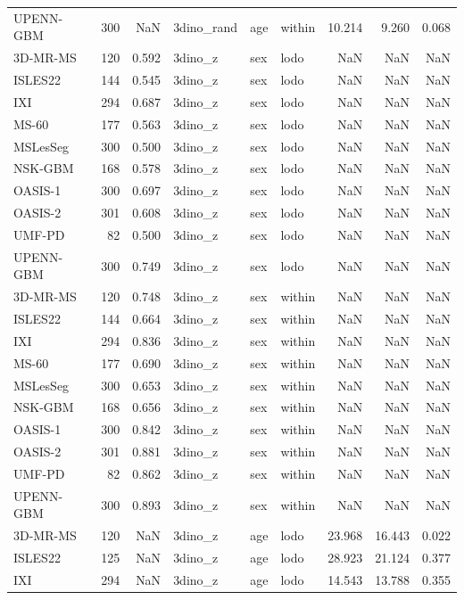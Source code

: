 \begin{tabular}{lrrlllrrr}
UPENN-GBM & 300 & NaN & 3dino\_rand & age & within & 10.214 & 9.260 & 0.068 \\
3D-MR-MS & 120 & 0.592 & 3dino\_z & sex & lodo & NaN & NaN & NaN \\
ISLES22 & 144 & 0.545 & 3dino\_z & sex & lodo & NaN & NaN & NaN \\
IXI & 294 & 0.687 & 3dino\_z & sex & lodo & NaN & NaN & NaN \\
MS-60 & 177 & 0.563 & 3dino\_z & sex & lodo & NaN & NaN & NaN \\
MSLesSeg & 300 & 0.500 & 3dino\_z & sex & lodo & NaN & NaN & NaN \\
NSK-GBM & 168 & 0.578 & 3dino\_z & sex & lodo & NaN & NaN & NaN \\
OASIS-1 & 300 & 0.697 & 3dino\_z & sex & lodo & NaN & NaN & NaN \\
OASIS-2 & 301 & 0.608 & 3dino\_z & sex & lodo & NaN & NaN & NaN \\
UMF-PD & 82 & 0.500 & 3dino\_z & sex & lodo & NaN & NaN & NaN \\
UPENN-GBM & 300 & 0.749 & 3dino\_z & sex & lodo & NaN & NaN & NaN \\
3D-MR-MS & 120 & 0.748 & 3dino\_z & sex & within & NaN & NaN & NaN \\
ISLES22 & 144 & 0.664 & 3dino\_z & sex & within & NaN & NaN & NaN \\
IXI & 294 & 0.836 & 3dino\_z & sex & within & NaN & NaN & NaN \\
MS-60 & 177 & 0.690 & 3dino\_z & sex & within & NaN & NaN & NaN \\
MSLesSeg & 300 & 0.653 & 3dino\_z & sex & within & NaN & NaN & NaN \\
NSK-GBM & 168 & 0.656 & 3dino\_z & sex & within & NaN & NaN & NaN \\
OASIS-1 & 300 & 0.842 & 3dino\_z & sex & within & NaN & NaN & NaN \\
OASIS-2 & 301 & 0.881 & 3dino\_z & sex & within & NaN & NaN & NaN \\
UMF-PD & 82 & 0.862 & 3dino\_z & sex & within & NaN & NaN & NaN \\
UPENN-GBM & 300 & 0.893 & 3dino\_z & sex & within & NaN & NaN & NaN \\
3D-MR-MS & 120 & NaN & 3dino\_z & age & lodo & 23.968 & 16.443 & 0.022 \\
ISLES22 & 125 & NaN & 3dino\_z & age & lodo & 28.923 & 21.124 & 0.377 \\
IXI & 294 & NaN & 3dino\_z & age & lodo & 14.543 & 13.788 & 0.355 \\

\end{tabular}
